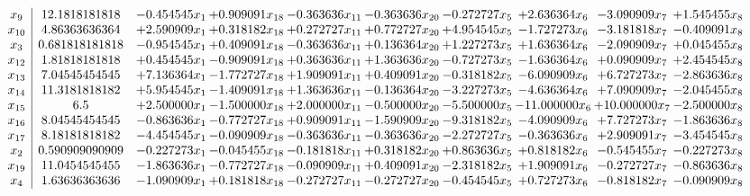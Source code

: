 \documentclass[10pt]{article}
\begin{document}
 \[\begin{array}{c| c c@{\hskip 2pt} c@{\hskip 2pt} c@{\hskip 2pt} c@{\hskip 2pt} c@{\hskip 2pt} c@{\hskip 2pt} c@{\hskip 2pt} c@{\hskip 2pt} }
 x_{9}   &  12.1818181818 & -0.454545 x_{1} & + 0.909091 x_{18} & -0.363636 x_{11} & -0.363636 x_{20} & -0.272727 x_{5} & + 2.636364 x_{6} & -3.090909 x_{7} & + 1.545455 x_{8}\\
 x_{10}   &  4.86363636364 & + 2.590909 x_{1} & + 0.318182 x_{18} & + 0.272727 x_{11} & + 0.772727 x_{20} & + 4.954545 x_{5} & -1.727273 x_{6} & -3.181818 x_{7} & -0.409091 x_{8}\\
 x_{3}   &  0.681818181818 & -0.954545 x_{1} & + 0.409091 x_{18} & -0.363636 x_{11} & + 0.136364 x_{20} & + 1.227273 x_{5} & + 1.636364 x_{6} & -2.090909 x_{7} & + 0.045455 x_{8}\\
 x_{12}   &  1.81818181818 & + 0.454545 x_{1} & -0.909091 x_{18} & + 0.363636 x_{11} & + 1.363636 x_{20} & -0.727273 x_{5} & -1.636364 x_{6} & + 0.090909 x_{7} & + 2.454545 x_{8}\\
 x_{13}   &  7.04545454545 & + 7.136364 x_{1} & -1.772727 x_{18} & + 1.909091 x_{11} & + 0.409091 x_{20} & -0.318182 x_{5} & -6.090909 x_{6} & + 6.727273 x_{7} & -2.863636 x_{8}\\
 x_{14}   &  11.3181818182 & + 5.954545 x_{1} & -1.409091 x_{18} & + 1.363636 x_{11} & -0.136364 x_{20} & -3.227273 x_{5} & -4.636364 x_{6} & + 7.090909 x_{7} & -2.045455 x_{8}\\
 x_{15}   &  6.5 & + 2.500000 x_{1} & -1.500000 x_{18} & + 2.000000 x_{11} & -0.500000 x_{20} & -5.500000 x_{5} & -11.000000 x_{6} & + 10.000000 x_{7} & -2.500000 x_{8}\\
 x_{16}   &  8.04545454545 & -0.863636 x_{1} & -0.772727 x_{18} & + 0.909091 x_{11} & -1.590909 x_{20} & -9.318182 x_{5} & -4.090909 x_{6} & + 7.727273 x_{7} & -1.863636 x_{8}\\
 x_{17}   &  8.18181818182 & -4.454545 x_{1} & -0.090909 x_{18} & -0.363636 x_{11} & -0.363636 x_{20} & -2.272727 x_{5} & -0.363636 x_{6} & + 2.909091 x_{7} & -3.454545 x_{8}\\
 x_{2}   &  0.590909090909 & -0.227273 x_{1} & -0.045455 x_{18} & -0.181818 x_{11} & + 0.318182 x_{20} & + 0.863636 x_{5} & + 0.818182 x_{6} & -0.545455 x_{7} & -0.227273 x_{8}\\
 x_{19}   &  11.0454545455 & -1.863636 x_{1} & -0.772727 x_{18} & -0.090909 x_{11} & + 0.409091 x_{20} & -2.318182 x_{5} & + 1.909091 x_{6} & -0.272727 x_{7} & -0.863636 x_{8}\\
 x_{4}   &  1.63636363636 & -1.090909 x_{1} & + 0.181818 x_{18} & -0.272727 x_{11} & -0.272727 x_{20} & -0.454545 x_{5} & + 0.727273 x_{6} & -0.818182 x_{7} & -0.090909 x_{8}\\

\end{array}\]
\end{document}
